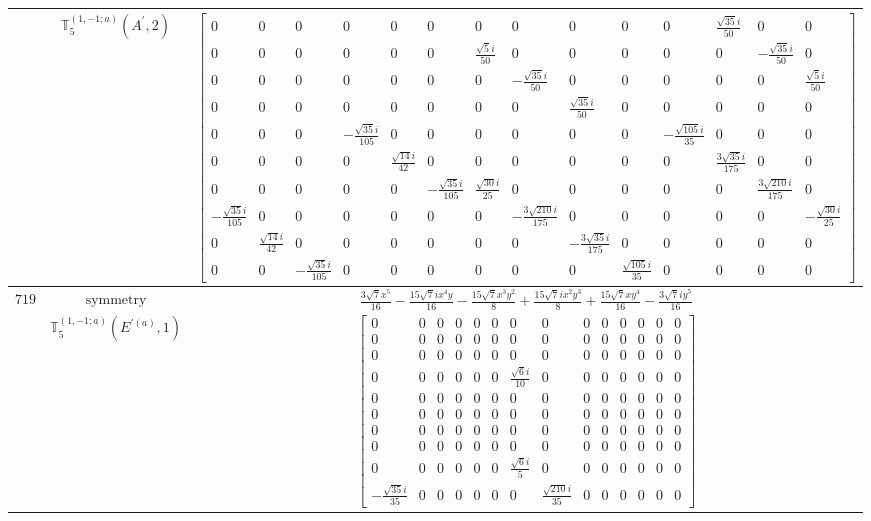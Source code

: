 \documentclass[fleqn,8pt,landscape]{jsarticle}
\begin{document}
\begin{longtable}{ccc}
$  $ & $ \mathbb{T}_{5}^{(1,-1;a)}(A^{\prime},2) $ & $ \begin{bmatrix} 0 & 0 & 0 & 0 & 0 & 0 & 0 & 0 & 0 & 0 & 0 & \frac{\sqrt{35} i}{50} & 0 & 0 \\ 0 & 0 & 0 & 0 & 0 & 0 & \frac{\sqrt{5} i}{50} & 0 & 0 & 0 & 0 & 0 & - \frac{\sqrt{35} i}{50} & 0 \\ 0 & 0 & 0 & 0 & 0 & 0 & 0 & - \frac{\sqrt{35} i}{50} & 0 & 0 & 0 & 0 & 0 & \frac{\sqrt{5} i}{50} \\ 0 & 0 & 0 & 0 & 0 & 0 & 0 & 0 & \frac{\sqrt{35} i}{50} & 0 & 0 & 0 & 0 & 0 \\ 0 & 0 & 0 & - \frac{\sqrt{35} i}{105} & 0 & 0 & 0 & 0 & 0 & 0 & - \frac{\sqrt{105} i}{35} & 0 & 0 & 0 \\ 0 & 0 & 0 & 0 & \frac{\sqrt{14} i}{42} & 0 & 0 & 0 & 0 & 0 & 0 & \frac{3 \sqrt{35} i}{175} & 0 & 0 \\ 0 & 0 & 0 & 0 & 0 & - \frac{\sqrt{35} i}{105} & \frac{\sqrt{30} i}{25} & 0 & 0 & 0 & 0 & 0 & \frac{3 \sqrt{210} i}{175} & 0 \\ - \frac{\sqrt{35} i}{105} & 0 & 0 & 0 & 0 & 0 & 0 & - \frac{3 \sqrt{210} i}{175} & 0 & 0 & 0 & 0 & 0 & - \frac{\sqrt{30} i}{25} \\ 0 & \frac{\sqrt{14} i}{42} & 0 & 0 & 0 & 0 & 0 & 0 & - \frac{3 \sqrt{35} i}{175} & 0 & 0 & 0 & 0 & 0 \\ 0 & 0 & - \frac{\sqrt{35} i}{105} & 0 & 0 & 0 & 0 & 0 & 0 & \frac{\sqrt{105} i}{35} & 0 & 0 & 0 & 0 \end{bmatrix} $ \\ \hline
$ 719 $ & $ \text{symmetry} $ & $ \frac{3 \sqrt{7} x^{5}}{16} - \frac{15 \sqrt{7} i x^{4} y}{16} - \frac{15 \sqrt{7} x^{3} y^{2}}{8} + \frac{15 \sqrt{7} i x^{2} y^{3}}{8} + \frac{15 \sqrt{7} x y^{4}}{16} - \frac{3 \sqrt{7} i y^{5}}{16} $ \\
$  $ & $ \mathbb{T}_{5}^{(1,-1;a)}(E^{\prime(a)},1) $ & $ \begin{bmatrix} 0 & 0 & 0 & 0 & 0 & 0 & 0 & 0 & 0 & 0 & 0 & 0 & 0 & 0 \\ 0 & 0 & 0 & 0 & 0 & 0 & 0 & 0 & 0 & 0 & 0 & 0 & 0 & 0 \\ 0 & 0 & 0 & 0 & 0 & 0 & 0 & 0 & 0 & 0 & 0 & 0 & 0 & 0 \\ 0 & 0 & 0 & 0 & 0 & 0 & \frac{\sqrt{6} i}{10} & 0 & 0 & 0 & 0 & 0 & 0 & 0 \\ 0 & 0 & 0 & 0 & 0 & 0 & 0 & 0 & 0 & 0 & 0 & 0 & 0 & 0 \\ 0 & 0 & 0 & 0 & 0 & 0 & 0 & 0 & 0 & 0 & 0 & 0 & 0 & 0 \\ 0 & 0 & 0 & 0 & 0 & 0 & 0 & 0 & 0 & 0 & 0 & 0 & 0 & 0 \\ 0 & 0 & 0 & 0 & 0 & 0 & 0 & 0 & 0 & 0 & 0 & 0 & 0 & 0 \\ 0 & 0 & 0 & 0 & 0 & 0 & \frac{\sqrt{6} i}{5} & 0 & 0 & 0 & 0 & 0 & 0 & 0 \\ - \frac{\sqrt{35} i}{35} & 0 & 0 & 0 & 0 & 0 & 0 & \frac{\sqrt{210} i}{35} & 0 & 0 & 0 & 0 & 0 & 0 \end{bmatrix} $ \\ \hline

\end{longtable}
\end{document}
